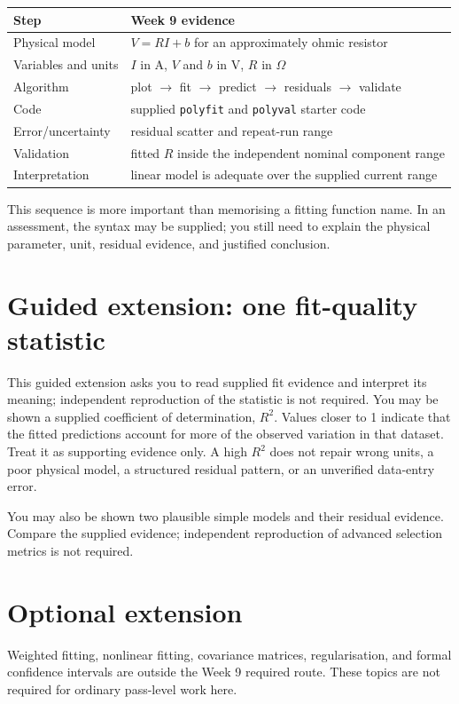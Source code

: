 \documentclass[11pt,a4paper]{article}
\begin{document}
\begin{center}\small
\begin{tabular}{p{.24\linewidth}p{.68\linewidth}}
\toprule
Step & Week 9 evidence\\
\midrule
Physical model & $V=RI+b$ for an approximately ohmic resistor\\
Variables and units & $I$ in A, $V$ and $b$ in V, $R$ in $\Omega$\\
Algorithm & plot $\rightarrow$ fit $\rightarrow$ predict $\rightarrow$ residuals $\rightarrow$ validate\\
Code & supplied \texttt{polyfit} and \texttt{polyval} starter code\\
Error/uncertainty & residual scatter and repeat-run range\\
Validation & fitted $R$ inside the independent nominal component range\\
Interpretation & linear model is adequate over the supplied current range\\
\bottomrule
\end{tabular}
\end{center}

This sequence is more important than memorising a fitting function name. In an assessment, the syntax may be supplied; you still need to explain the physical parameter, unit, residual evidence, and justified conclusion.

\section*{Guided extension: one fit-quality statistic}
This guided extension asks you to read supplied fit evidence and interpret its meaning; independent reproduction of the statistic is not required. You may be shown a supplied coefficient of determination, $R^2$. Values closer to 1 indicate that the fitted predictions account for more of the observed variation in that dataset. Treat it as supporting evidence only. A high $R^2$ does not repair wrong units, a poor physical model, a structured residual pattern, or an unverified data-entry error.

You may also be shown two plausible simple models and their residual evidence. Compare the supplied evidence; independent reproduction of advanced selection metrics is not required.

\section*{Optional extension}
Weighted fitting, nonlinear fitting, covariance matrices, regularisation, and formal confidence intervals are outside the Week 9 required route. These topics are not required for ordinary pass-level work here.
\end{document}

